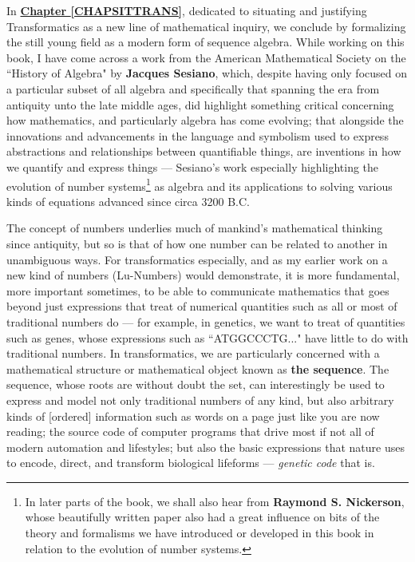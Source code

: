 \documentclass[a4paper, 18pt]{book} %
\begin{document}
In \textbf{\hyperref[CHAPSITTRANS]{Chapter \ref{CHAPSITTRANS}}}, dedicated to situating and justifying Transformatics as a new line of mathematical inquiry, we conclude by formalizing the still young field as a modern form of sequence algebra. While working on this book, I have come across a work\cite{Sesiano2009} from the American Mathematical Society on the ``History of Algebra" by \textbf{Jacques Sesiano}, which, despite having only focused on a particular subset of all algebra and specifically that spanning the era from antiquity unto the late middle ages, did highlight something critical concerning how mathematics, and particularly algebra has come evolving; that alongside the innovations and advancements in the language and symbolism used to express abstractions and relationships between quantifiable things, are inventions in how we quantify and express things --- Sesiano's work especially highlighting the evolution of number systems\footnote{In later parts of the book, we shall also hear from \textbf{Raymond S. Nickerson}, whose beautifully written paper\cite{nickerson1988counting} also had a great influence on bits of the theory and formalisms we have introduced or developed in this book in relation to the evolution of number systems.} as algebra and its applications to solving various kinds of equations advanced since circa 3200 B.C. 

\vspace{2em}

The concept of numbers underlies much of mankind's mathematical thinking since antiquity, but so is that of how one number can be related to another in unambiguous ways. For transformatics especially, and as my earlier work on a new kind of numbers (Lu-Numbers\cite{lnspaper}) would demonstrate, it is more fundamental, more important sometimes, to be able to communicate mathematics that goes beyond just expressions that treat of numerical quantities such as all or most of traditional numbers do --- for example, in genetics, we want to treat of quantities such as genes, whose expressions such as ``ATGGCCCTG..." have little to do with traditional numbers. In transformatics, we are particularly concerned with a mathematical structure or mathematical object known as \textbf{the sequence}. The sequence, whose roots are without doubt the set, can interestingly be used to express and model not only traditional numbers of any kind, but also arbitrary kinds of [ordered] information such as words on a page just like you are now reading; the source code of computer programs that drive most if not all of modern automation and lifestyles; but also the basic expressions that nature uses to encode, direct, and transform biological lifeforms --- \textit{genetic code} that is.
\end{document}
